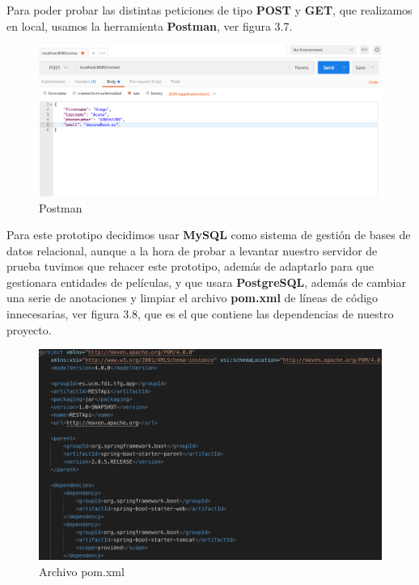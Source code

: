 \begin{flushleft}
    Para poder probar las distintas peticiones de tipo \textbf{POST} y \textbf{GET}, que realizamos en local, usamos la herramienta 
    \textbf{Postman}, ver figura 3.7.
    \begin{figure}[H]
        \centering
        \includegraphics[width=6in]{figures/Postman.png}
        \caption{Postman}
    \end{figure}
    Para este prototipo decidimos usar \textbf{MySQL} como sistema de gestión de bases de datos relacional, aunque
    a la hora de probar a levantar nuestro servidor de prueba tuvimos que rehacer este prototipo, además de adaptarlo para 
    que gestionara entidades de películas, y que usara \textbf{PostgreSQL}, además de cambiar una serie de anotaciones y limpiar 
    el archivo \textbf{pom.xml} de líneas de código innecesarias, ver figura 3.8, que es el que contiene las dependencias de nuestro proyecto.
    \begin{figure}[H]
        \centering
        \includegraphics[width=6in]{figures/PomXML.png}
        \caption{Archivo pom.xml}
    \end{figure}
\end{flushleft}